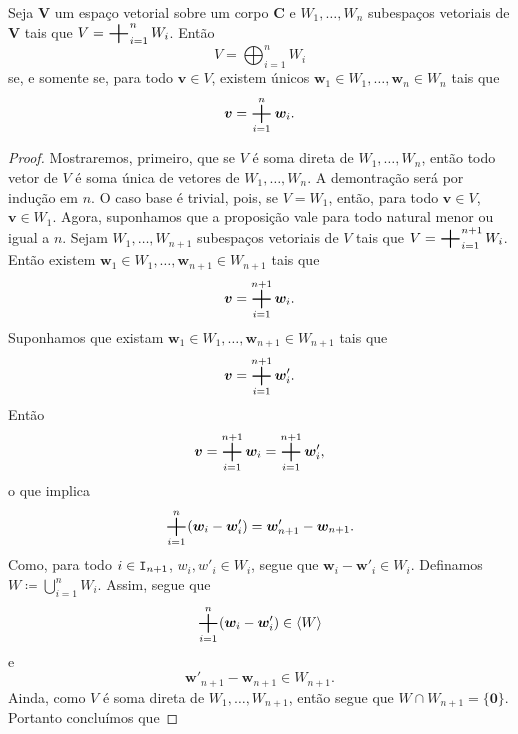 \begin{prop}
	Seja $\bm V$ um espaço vetorial sobre um corpo $\bm C$ e $W_1,\ldots,W_n$ subespaços vetoriais de $\bm V$ tais que $V = \bigsum_{i=1}^n W_i$. Então
	\begin{equation*}
	V=\bigoplus_{i=1}^n W_i
	\end{equation*}
se, e somente se, para todo $\bm v \in V$, existem únicos $\bm w_1 \in W_1,\ldots,\bm w_n \in W_n$ tais que
	\begin{equation*}
	\bm v = \bigsum_{i=1}^n \bm w_i.
	\end{equation*}
\end{prop}
\begin{proof}
	Mostraremos, primeiro, que se $V$ é soma direta de $W_1,\ldots,W_n$, então todo vetor de $V$ é soma única de vetores de $W_1,\ldots,W_n$. A demontração será por indução em $n$. O caso base é trivial, pois, se $V=W_1$, então, para todo $\bm v \in V$, $\bm v \in W_1$. Agora, suponhamos que a proposição vale para todo natural menor ou igual a $n$. Sejam $W_1,\ldots,W_{n+1}$ subespaços vetoriais de $V$ tais que $V = \bigsum_{i=1}^{n+1} W_i$. Então existem $\bm w_1 \in W_1,\ldots,\bm w_{n+1} \in W_{n+1}$ tais que
	\begin{equation*}
	\bm v = \bigsum_{i=1}^{n+1} \bm w_i.
	\end{equation*}
Suponhamos que existam $\bm w_1 \in W_1,\ldots,\bm w_{n+1} \in W_{n+1}$ tais que
	\begin{equation*}
	\bm v = \bigsum_{i=1}^{n+1} \bm w'_i.
	\end{equation*}
Então
	\begin{equation*}
	\bm v = \bigsum_{i=1}^{n+1} \bm w_i = \bigsum_{i=1}^{n+1} \bm w'_i,
	\end{equation*}
o que implica
	\begin{equation*}
	\bigsum_{i=1}^n (\bm w_i - \bm w'_i) = \bm w'_{n+1} - \bm w_{n+1}.
	\end{equation*}
Como, para todo $i \in \mathtt I_{n+1}$, $w_i,w'_i \in W_i$, segue que $\bm w_i - \bm w'_i \in W_i$. Definamos $W \coloneqq \bigcup_{i=1}^n W_i$. Assim, segue que
	\begin{equation*}
	\bigsum_{i=1}^n (\bm w_i - \bm w'_i) \in \langle W \rangle
	\end{equation*}
e
	\begin{equation*}
	\bm w'_{n+1} - \bm w_{n+1} \in W_{n+1}.
	\end{equation*}
Ainda, como $V$ é soma direta de $W_1,\ldots,W_{n+1}$, então segue que $W \cap W_{n+1} = \{\bm 0\}$. Portanto concluímos que

\end{proof}
